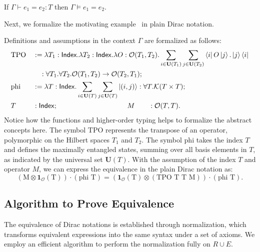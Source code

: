 \begin{lemma}\label{lem: axiom sound}
If \( \Gamma \vdash e_1 = e_2 :T \) then \( \Gamma \vDash e_1 = e_2\).
\end{lemma}
Next, we formalize the motivating example~ in
plain Dirac notation.
\begin{example}
    \label{ex: formalizing motivating}
    Definitions and assumptions in the context \( \Gamma \) are formalized as follows:
    \begin{align*}
        & \text{TPO} && := \lambda T_1 : \mathsf{Index}. \lambda T_2 : \mathsf{Index}. \lambda O : \mathcal{O}(T_1, T_2). \sum_{i \in \mathbf{U}(T_1)} \sum_{j \in \mathbf{U}(T_2)} \bra{i} O \ket{j} . \ket{j}\bra{i} \\
        & &&\quad : \forall T_1. \forall T_2. \mathcal{O}(T_1, T_2) \to \mathcal{O}(T_2, T_1); \\
        &\text{phi} &&:= \lambda T : \mathsf{Index}. \sum_{i \in \mathbf{U}(T)} \sum_{j \in \mathbf{U}(T)} \ket{(i, j)} : \forall T.\mathcal{K}(T \times T); \\
        & T && : \mathsf{Index};  \qquad \qquad \qquad \qquad \qquad M \qquad : \mathcal{O}(T, T).
    \end{align*}
    Notice how the functions and higher-order typing helps to formalize the abstract concepts here.
    The symbol \( \text{TPO} \) represents the transpose of an operator, polymorphic on the Hilbert spaces \( T_1 \) and \( T_2 \). 
    The symbol \( \text{phi} \) takes the index \( T \) and defines the maximally entangled states, summing over all basis elements in \( T \), as indicated by the universal set \( \mathbf{U}(T) \).
    With the assumption of the index \( T \) and operator \( M \), we can express the equivalence in the plain Dirac notation as:
    \[
    (\textrm{M} \otimes \mathbf{1}_\mathcal{O}(\textrm{T})) \cdot (\textrm{phi T}) = (\mathbf{1}_\mathcal{O}(\textrm{T}) \otimes (\textrm{TPO T T M})) \cdot (\textrm{phi T}).
    \]
\end{example}



\subsection{Algorithm to Prove Equivalence}

The equivalence of Dirac notations is established through normalization, which transforms equivalent expressions into the same syntax under a set of axioms. We employ an efficient algorithm to perform the normalization fully on $R \cup E$.

